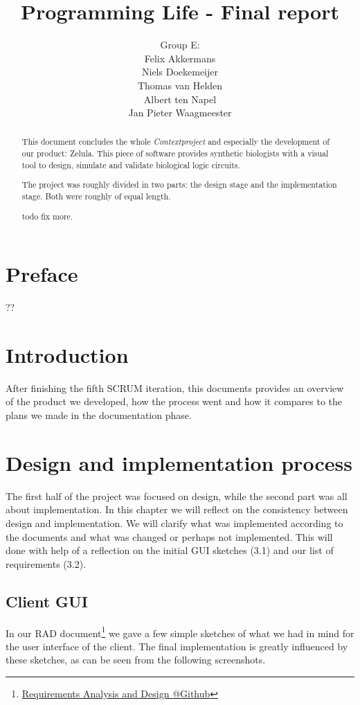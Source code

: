 \documentclass[a4paper]{article}
\title{Programming Life - Final report}
\author{Group E:\\
Felix Akkermans \\
Niels Doekemeijer \\
Thomas van Helden \\
Albert ten Napel \\
Jan Pieter Waagmeester}
\makeatletter
\newcommand{\urlRAD}{https://github.com/FelixAkk/synthbio/raw/master/deliverables/rad/rad.pdf}
\newcommand{\hrefRAD}{\href{\urlRAD}{Requirements Analysis and Design @Github}}
\makeatother
\begin{document}
\maketitle
\thispagestyle{empty}
\vfill

\small{\tableofcontents}
\pagebreak{}

\section*{Preface} ??


\pagebreak
\begin{abstract}
\noindent This document concludes the whole \textit{Contextproject} and especially the development of our product: Zelula. This piece of software provides synthetic biologists with a visual tool to design, simulate and validate biological logic circuits.

The project was roughly divided in two parts: the design stage and the implementation stage. Both were roughly of equal length.

todo fix more.
\end{abstract}
\pagebreak

\section{Introduction}
After finishing the fifth SCRUM iteration, this documents provides an overview of the product we developed, how the process went and how it compares to the plans we made in the documentation phase. 




\section{Design and implementation process}
The first half of the project was focused on design, while the second part was all about implementation. In this chapter we will reflect on the consistency between design and implementation. We will clarify what was implemented according to the documents and what was changed or perhaps not implemented. This will done with help of a reflection on the initial GUI sketches (3.1) and our list of requirements (3.2).

\subsection{Client GUI}
In our RAD document\footnote{\hrefRAD} we gave a few simple sketches of what we had in mind for the user interface of the client. The final implementation is greatly influenced by these sketches, as can be seen from the following screenshots.\\
\end{document}
